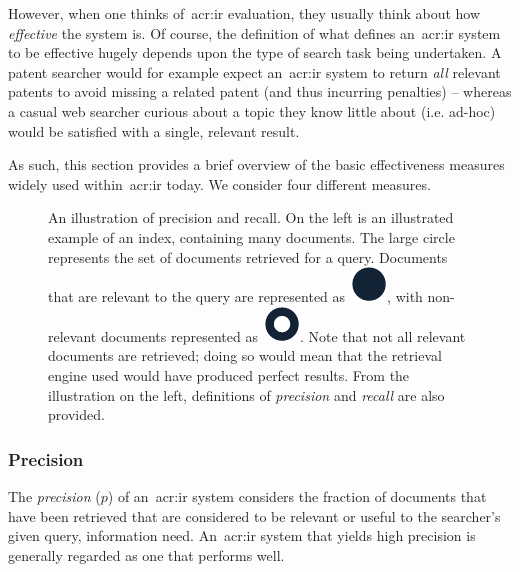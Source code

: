 However, when one thinks of~\gls{acr:ir} evaluation, they usually think about how \emph{effective} the system is. Of course, the definition of what defines an~\gls{acr:ir} system to be effective hugely depends upon the type of search task being undertaken. A patent searcher would for example expect an~\gls{acr:ir} system to return \emph{all} relevant patents to avoid missing a related patent (and thus incurring penalties) -- whereas a casual web searcher curious about a topic they know little about (i.e. ad-hoc) would be satisfied with a single, relevant result.

As such, this section provides a brief overview of the basic effectiveness measures widely used within~\gls{acr:ir} today. We consider four different measures.

\begin{figure}[t!]
    \centering
    \caption[Precision and recall]{An illustration of precision and recall. On the left is an illustrated example of an index, containing many documents. The large circle represents the set of documents retrieved for a query. Documents that are relevant to the query are represented as~\includegraphics[height=\fontcharht\font`\d]{figures/ch2-pr-r.pdf}, with non-relevant documents represented as~\includegraphics[height=\fontcharht\font`\d]{figures/ch2-pr-nr.pdf}. Note that not all relevant documents are retrieved; doing so would mean that the retrieval engine used would have produced perfect results. From the illustration on the left, definitions of \emph{precision} and \emph{recall} are also provided.}
    \label{fig:pr}
\end{figure}

\subsubsection{Precision}
The \emph{precision} ($p$) of an~\gls{acr:ir} system considers the fraction of documents that have been retrieved that are considered to be relevant or useful to the searcher's given query, information need. An~\gls{acr:ir} system that yields high precision is generally regarded as one that performs well.

